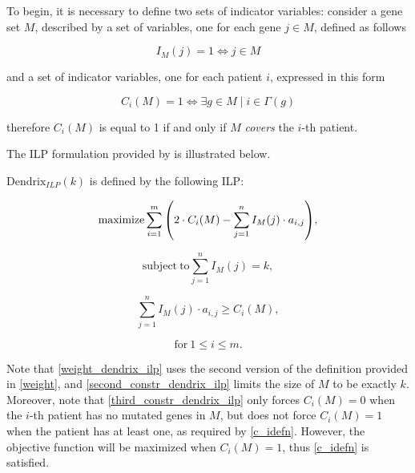 To begin, it is necessary to define two sets of indicator variables: consider a gene set $M$, described by a set of variables, one for each gene $j \in M$, defined as follows

\begin{equation}
    I_M(j) = 1 \iff j \in M
\end{equation}

and a set of indicator variables, one for each patient $i$, expressed in this form

\begin{equation} \label{c_idefn}
    C_i(M) = 1 \iff \exists g \in M \mid i \in \Gamma(g)
\end{equation}

therefore $C_i(M)$ is equal to 1 if and only if $M$ \textit{covers} the $i$-th patient.

The ILP formulation provided by \textcite{multi-dendrix} is illustrated below.

\begin{definition}
    $\mathrm{Dendrix}_{\mathrm{\textit{ILP}}}(k)$ is defined by the following ILP:

    \begin{equation} \label{weight_dendrix_ilp}
        \mathrm{maximize} \sum_{i = 1}^m {\left(2 \cdot C_i(M) - \sum_{j = 1}^n I_M(j) \cdot a_{i, j}\right)},
    \end{equation}

    \begin{equation} \label{second_constr_dendrix_ilp}
        \mathrm{subject \ to} \sum_{j = 1}^n{I_M(j) = k},
    \end{equation}

    \begin{equation} \label{third_constr_dendrix_ilp}
        \sum_{j = 1}^n I_M(j) \cdot {a_{i, j}} \ge C_i(M),
    \end{equation}

    \begin{equation*}
        \mathrm{for\ } 1 \le i \le m.
    \end{equation*}
\end{definition}

Note that \cref{weight_dendrix_ilp} uses the second version of the definition provided in \cref{weight}, and \cref{second_constr_dendrix_ilp} limits the size of $M$ to be exactly $k$. Moreover, note that \cref{third_constr_dendrix_ilp} only forces $C_i(M) = 0$ when the $i$-th patient has no mutated genes in $M$, but does not force $C_i(M) = 1$ when the patient has at least one, as required by \cref{c_idefn}. However, the objective function will be maximized when $C_i(M)=1$, thus \cref{c_idefn} is satisfied.

